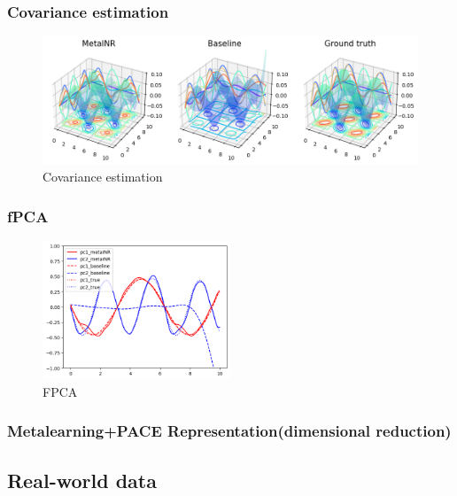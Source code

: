 \documentclass{article}
\begin{document}
\subsubsection{Covariance estimation}

\begin{figure}
  \centering
  \includegraphics[width=\textwidth]{covariance.png}
  \caption{Covariance estimation}
\end{figure}

\subsubsection{fPCA}
\begin{figure}
  \centering
  \includegraphics[width=0.5\textwidth]{fPCA.png}
  \caption{FPCA}
\end{figure}

\subsubsection{Metalearning+PACE Representation(dimensional reduction)}





\subsection{Real-world data}
\end{document}
